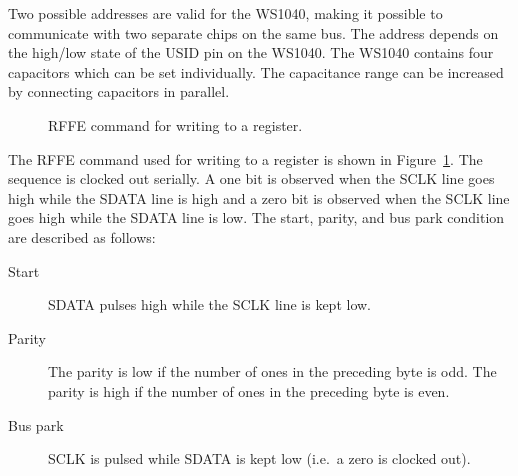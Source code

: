 Two possible addresses are valid for the WS1040, making it possible to communicate with two separate chips on the same bus. The address depends on the high/low state of the USID pin on the WS1040. The WS1040 contains four capacitors which can be set individually. The capacitance range can be increased by connecting capacitors in parallel.

\begin{figure}[htbp]
    \centering
    \caption{RFFE command for writing to a register.}
    \label{fig:rffe_write_register}
\end{figure}
The RFFE command used for writing to a register is shown in Figure~\ref{fig:rffe_write_register}. The sequence is clocked out serially. A one bit is observed when the SCLK line goes high while the SDATA line is high and a zero bit is observed when the SCLK line goes high while the SDATA line is low. The start, parity, and bus park condition are described as follows:
\begin{description}
    \item[Start] SDATA pulses high while the SCLK line is kept low.
    \item[Parity] The parity is low if the number of ones in the preceding byte is odd. The parity is high if the number of ones in the preceding byte is even.
    \item[Bus park] SCLK is pulsed while SDATA is kept low (i.e.\ a zero is clocked out).
\end{description}
